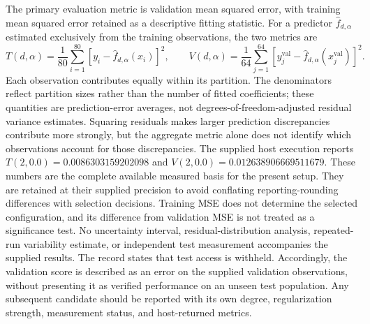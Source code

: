 \documentclass[11pt]{article}
\begin{document}
The primary evaluation metric is validation mean squared error, with training mean squared error retained as a descriptive fitting statistic. For a predictor \(\widehat f_{d,\alpha}\) estimated exclusively from the training observations, the two metrics are
\[
T(d,\alpha)=\frac{1}{80}\sum_{i=1}^{80}
\left[y_i-\widehat f_{d,\alpha}(x_i)\right]^2,
\qquad
V(d,\alpha)=\frac{1}{64}\sum_{j=1}^{64}
\left[y_j^{\mathrm{val}}-
\widehat f_{d,\alpha}(x_j^{\mathrm{val}})\right]^2.
\]
Each observation contributes equally within its partition. The denominators reflect partition sizes rather than the number of fitted coefficients; these quantities are prediction-error averages, not degrees-of-freedom-adjusted residual variance estimates. Squaring residuals makes larger prediction discrepancies contribute more strongly, but the aggregate metric alone does not identify which observations account for those discrepancies. The supplied host execution reports \(T(2,0.0)=0.0086303159202098\) and \(V(2,0.0)=0.012638906669511679\). These numbers are the complete available measured basis for the present setup. They are retained at their supplied precision to avoid conflating reporting-rounding differences with selection decisions. Training MSE does not determine the selected configuration, and its difference from validation MSE is not treated as a significance test. No uncertainty interval, residual-distribution analysis, repeated-run variability estimate, or independent test measurement accompanies the supplied results. The record states that test access is withheld. Accordingly, the validation score is described as an error on the supplied validation observations, without presenting it as verified performance on an unseen test population. Any subsequent candidate should be reported with its own degree, regularization strength, measurement status, and host-returned metrics.
\end{document}
